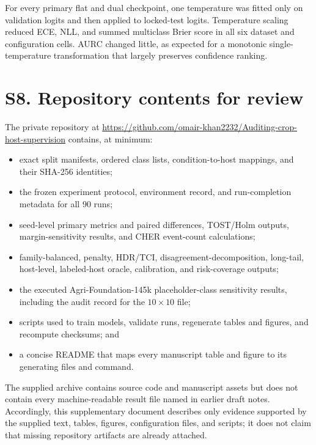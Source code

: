 \documentclass[preprint,12pt]{elsarticle}
\begin{document}
For every primary flat and dual checkpoint, one temperature was fitted only on
validation logits and then applied to locked-test logits. Temperature scaling
reduced ECE, NLL, and summed multiclass Brier score in all six
 dataset and configuration cells. AURC changed little, as expected for a monotonic
single-temperature transformation that largely preserves confidence ranking.

\section*{S8. Repository contents for review}

The private repository at
\url{https://github.com/omair-khan2232/Auditing-crop-host-supervision} contains,
at minimum:
\begin{itemize}
  \item exact split manifests, ordered class lists, condition-to-host mappings,
  and their SHA-256 identities;
  \item the frozen experiment protocol, environment record, and run-completion
  metadata for all 90 runs;
  \item seed-level primary metrics and paired differences, TOST/Holm outputs,
  margin-sensitivity results, and CHER event-count calculations;
  \item family-balanced, penalty, HDR/TCI, disagreement-decomposition,
  long-tail, host-level, labeled-host oracle, calibration, and risk-coverage
  outputs;
  \item the executed Agri-Foundation-145k placeholder-class sensitivity
  results, including the audit record for the $10\times10$ file;
  \item scripts used to train models, validate runs, regenerate tables and
  figures, and recompute checksums; and
  \item a concise README that maps every manuscript table and figure to its
  generating files and command.
\end{itemize}

The supplied archive contains source code and manuscript assets but does not
contain every machine-readable result file named in earlier draft notes.
Accordingly, this supplementary document describes only evidence supported by
the supplied text, tables, figures, configuration files, and scripts; it does
not claim that missing repository artifacts are already attached.
\end{document}
